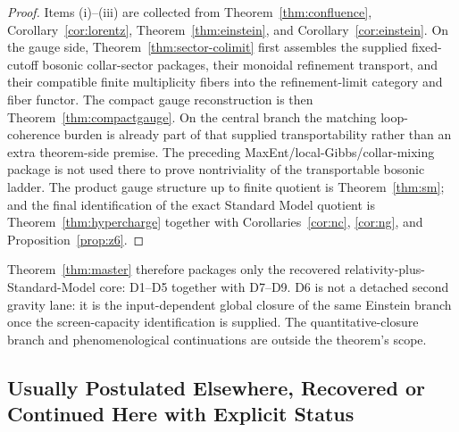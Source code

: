 \documentclass[11pt]{article}
\begin{document}
\begin{proof}
Items (i)--(iii) are collected from Theorem~\ref{thm:confluence}, Corollary~\ref{cor:lorentz}, Theorem~\ref{thm:einstein}, and Corollary~\ref{cor:einstein}. On the gauge side, Theorem~\ref{thm:sector-colimit} first assembles the supplied fixed-cutoff bosonic collar-sector packages, their monoidal refinement transport, and their compatible finite multiplicity fibers into the refinement-limit category and fiber functor. The compact gauge reconstruction is then Theorem~\ref{thm:compactgauge}. On the central branch the matching loop-coherence burden is already part of that supplied transportability rather than an extra theorem-side premise. The preceding MaxEnt/local-Gibbs/collar-mixing package is not used there to prove nontriviality of the transportable bosonic ladder. The product gauge structure up to finite quotient is Theorem~\ref{thm:sm}; and the final identification of the exact Standard Model quotient is Theorem~\ref{thm:hypercharge} together with Corollaries~\ref{cor:nc}, \ref{cor:ng}, and Proposition~\ref{prop:z6}.
\end{proof}

Theorem~\ref{thm:master} therefore packages only the recovered relativity-plus-Standard-Model core: D1--D5 together with D7--D9. D6 is not a detached second gravity lane: it is the input-dependent global closure of the same Einstein branch once the screen-capacity identification is supplied. The quantitative-closure branch and phenomenological continuations are outside the theorem's scope.

\subsection*{Usually Postulated Elsewhere, Recovered or Continued Here with Explicit Status}
\end{document}
